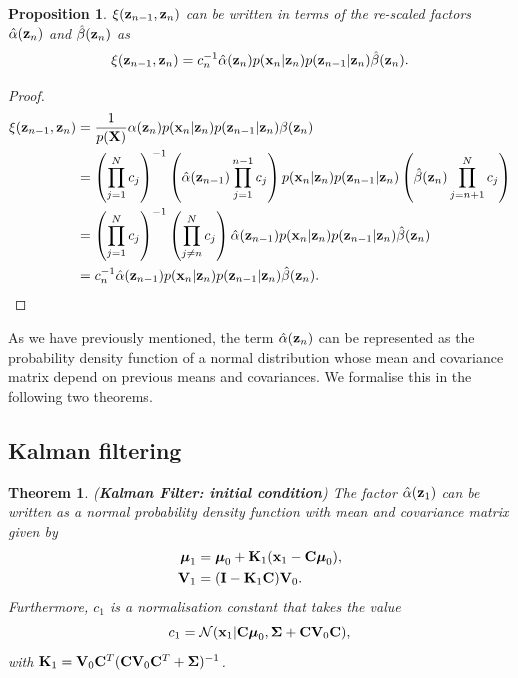 \documentclass[12pt, oneside]{book}
\numberwithin{equation}{section}
\newcommand{\x}{{\bf x}}
\newcommand{\z}{{\bf z}}
\newcommand{\N}{\mathcal{N}}
\newtheorem{proposition}{Proposition}[section]
\newtheorem{theorem}{Theorem}[section]
\begin{document}
{\begin{proposition} \label{prop:xi-rewrite}
	$\xi(\z_{n-1}, \z_n)$ can be written in terms of the re-scaled factors $\hat\alpha(\z_n)$ and $\hat\beta(\z_n)$ as
	\begin{equation}
		\xi(\z_{n-1}, \z_{n}) = c_n^{-1}\hat\alpha(\z_n)p(\x_n \vert \z_n) p(\z_{n-1}\vert \z_n)\hat\beta(\z_n).
	\end{equation}
\end{proposition}

\begin{proof}
	\begin{align}
		\xi(\z_{n-1}, \z_n) &= \frac{1}{p({\bf X})} \alpha(\z_n) p(\x_n \vert \z_n) p(\z_{n-1} \vert \z_n) \beta(\z_n) \\
		&= \left(\prod_{j=1}^N c_j\right)^{-1} \left(\hat\alpha(\z_{n-1}) \prod_{j=1}^{n-1} c_j\right)p(\x_n \vert \z_n) p(\z_{n-1} \vert \z_n)\left(\hat\beta(\z_n) \prod_{j={n+1}}^N c_j\right) \\
		&= \left(\prod_{j=1}^N c_j\right)^{-1} \left(\prod_{j\neq n}^N c_j\right) \hat\alpha(\z_{n-1}) p(\x_n \vert \z_n) p(\z_{n-1} \vert \z_n) \hat\beta(\z_n)\\
		&= c_n^{-1}\hat\alpha(\z_{n-1}) p(\x_n \vert \z_n) p(\z_{n-1} \vert \z_n) \hat\beta(\z_n).
	\end{align}
\end{proof}

As we have previously mentioned, the term $\hat\alpha(\z_n)$ can be represented as the probability density function of a normal distribution whose mean and covariance matrix depend on previous means and covariances. We formalise this in the following two theorems.

\subsection{Kalman filtering}
\begin{theorem} (\textbf{Kalman Filter: initial condition}) \label{theorem:kalman-filter-initial}
	The factor $\hat\alpha(\z_1)$ can be written as a normal probability density function with mean and covariance matrix given by
	\begin{align}
		\boldsymbol{\mu}_1 &= \boldsymbol{\mu}_0 + {\bf K}_1(\x_1 -{\bf C}\boldsymbol\mu_0),\\
		{\bf V}_1 &=  ({\bf I} - {\bf K}_1{\bf C}){\bf V}_0.
	\end{align}
	Furthermore, $c_1$ is a normalisation constant that takes the value
	\begin{equation}
		c_1 = \N(\x_1\vert {\bf C}\boldsymbol\mu_0, \boldsymbol\Sigma + {\bf C} {\bf V}_0 {\bf C}),
	\end{equation}
	with ${\bf K}_1 = {\bf V}_0{\bf C}^T({\bf C} {\bf V}_0 {\bf C}^T + \boldsymbol\Sigma)^{-1}$.
\end{theorem}

}
\end{document}
